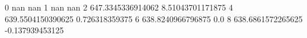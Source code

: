 0 nan nan
1 nan nan
2 647.3345336914062 8.51043701171875
4 639.5504150390625 0.726318359375
6 638.8240966796875 0.0
8 638.6861572265625 -0.137939453125
